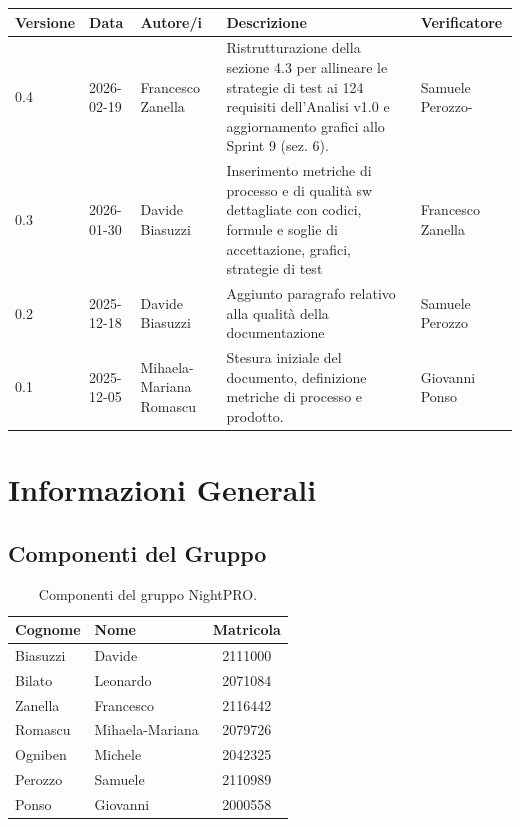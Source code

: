 \documentclass[a4paper,11pt,oneside]{scrartcl}
\begin{document}
\begin{center}
\renewcommand{\arraystretch}{1.5}
\begin{tabularx}{\textwidth}{@{}p{}p{}p{}X>{\centering\arraybackslash}p{}@{}}
\toprule
\textbf{Versione} & \textbf{Data} & \textbf{Autore/i} & \textbf{Descrizione} & \textbf{Verificatore} \\
\midrule
0.4 & 2026-02-19 & Francesco Zanella & Ristrutturazione della sezione 4.3 per allineare le strategie di test ai 124 requisiti dell'Analisi v1.0 e aggiornamento grafici allo Sprint 9 (sez. 6). & Samuele Perozzo-\\
0.3 & 2026-01-30 & Davide Biasuzzi & Inserimento metriche di processo e di qualità sw dettagliate con codici, formule e soglie di accettazione, grafici, strategie di test & Francesco Zanella\\
0.2 & 2025-12-18 & Davide Biasuzzi & Aggiunto paragrafo relativo alla qualità della documentazione & Samuele Perozzo\\
0.1 & 2025-12-05 & Mihaela-Mariana Romascu & Stesura iniziale del documento, definizione metriche di processo e prodotto. & Giovanni Ponso\\
\bottomrule
\end{tabularx}
\end{center}

\newpage
\tableofcontents
\newpage

\section*{Informazioni Generali}

\subsection*{Componenti del Gruppo}

\begin{table}[h!]
\centering
\renewcommand{\arraystretch}{1.2}
\begin{tabular}{@{}llc@{}}
\toprule
\textbf{Cognome} & \textbf{Nome} & \textbf{Matricola} \\
\midrule
Biasuzzi & Davide & 2111000 \\
Bilato & Leonardo & 2071084 \\
Zanella & Francesco & 2116442 \\
Romascu & Mihaela-Mariana & 2079726 \\
Ogniben & Michele & 2042325 \\
Perozzo & Samuele & 2110989 \\
Ponso & Giovanni & 2000558 \\
\bottomrule
\end{tabular}
\caption{Componenti del gruppo NightPRO.}
\end{table}
\end{document}
